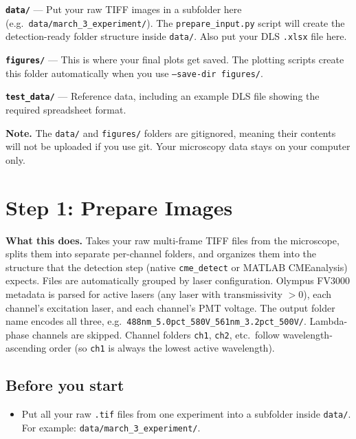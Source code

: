 \documentclass[11pt]{article}
\newcommand{\code}[1]{\texttt{#1}}
\begin{document}
\textbf{\code{data/}} --- Put your raw TIFF images in a subfolder here
(e.g.\ \code{data/march\_3\_experiment/}). The
\code{prepare\_input.py} script will create the detection-ready folder
structure inside \code{data/}. Also put your DLS \code{.xlsx} file
here.

\textbf{\code{figures/}} --- This is where your final plots get
saved. The plotting scripts create this folder automatically when you
use \code{--save-dir figures/}.

\textbf{\code{test\_data/}} --- Reference data, including an example
DLS file showing the required spreadsheet format.

\begin{notebox}
\textbf{Note.} The \code{data/} and \code{figures/} folders are
gitignored, meaning their contents will not be uploaded if you use
git. Your microscopy data stays on your computer only.
\end{notebox}

\section{Step 1: Prepare Images}

\textbf{What this does.} Takes your raw multi-frame TIFF files from
the microscope, splits them into separate per-channel folders, and
organizes them into the structure that the detection step (native
\code{cme\_detect} or MATLAB CMEanalysis) expects. Files are
automatically grouped by laser configuration. Olympus FV3000 metadata
is parsed for active lasers (any laser with transmissivity $> 0$),
each channel's excitation laser, and each channel's PMT voltage. The
output folder name encodes all three, e.g.\
\code{488nm\_5.0pct\_580V\_561nm\_3.2pct\_500V/}. Lambda-phase
channels are skipped. Channel folders \code{ch1}, \code{ch2}, etc.\
follow wavelength-ascending order (so \code{ch1} is always the lowest
active wavelength).

\subsection*{Before you start}

\begin{itemize}[leftmargin=*]
    \item Put all your raw \code{.tif} files from one experiment into
    a subfolder inside \code{data/}. For example:
    \code{data/march\_3\_experiment/}.
\end{itemize}
\end{document}

